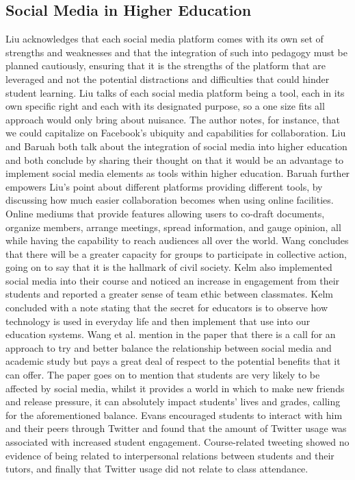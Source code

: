 \documentclass[lettersize,journal]{IEEEtran}
\begin{document}
\subsection{Social Media in Higher Education}
    Liu \cite{Liu2010}  acknowledges that each social media platform comes with
    its own set of strengths and weaknesses and that the integration of such into
    pedagogy must be planned cautiously, ensuring that it is the strengths of the platform
    that are leveraged and not the potential distractions and difficulties that could
    hinder student learning. Liu talks of each social media platform being a tool,
    each in its own specific right and each with its designated purpose, so a one size
    fits all approach would only bring about nuisance. The author notes, for instance,
    that we could capitalize on Facebook's ubiquity and capabilities for collaboration.
    Liu \cite{Liu2010} and Baruah \cite{Baruah2012} both talk about the integration of
    social media into higher education and both conclude by sharing their thought on that
    it would be an advantage to implement social media elements as tools within higher
    education. Baruah further empowers Liu's point about different platforms providing
    different tools, by discussing how much easier collaboration becomes when using
    online facilities. Online mediums that provide features allowing users to co-draft
    documents, organize members, arrange meetings, spread information, and gauge opinion,
    all while having the capability to reach audiences all over the world.
    Wang concludes that there will be a greater capacity for groups to participate in
    collective action, going on to say that it is the hallmark of civil society.
    Kelm \cite{Kelm2011} also implemented social media into their course and noticed an
    increase in engagement from their students and reported a greater sense of team ethic
    between classmates. Kelm concluded with a note stating that the secret for educators is
    to observe how technology is used in everyday life and then implement that use into
    our education systems.
    Wang et al. \cite{Wang2011} mention in the paper that there is a call for an approach
    to try and better balance the relationship between social media and academic study but
    pays a great deal of respect to the potential benefits that it can offer. The paper goes
    on to mention that students are very likely to be affected by social media, whilst it
    provides a world in which to make new friends and release pressure, it can absolutely
    impact students' lives and grades, calling for the aforementioned balance.
    Evans \cite{Evans2014} encouraged students to interact with him and their peers through
    Twitter and found that the amount of Twitter usage was associated with increased student
    engagement. Course-related tweeting showed no evidence of being related to interpersonal
    relations between students and their tutors, and finally that Twitter usage did not relate
    to class attendance.
\end{document}
